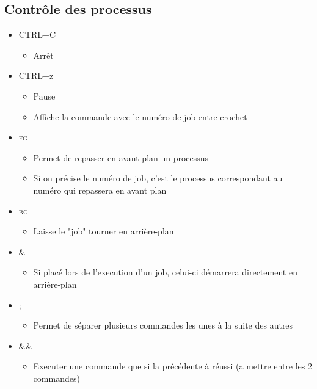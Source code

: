 \documentclass[a4paper]{article}
\begin{document}
      \subsection{Contrôle des processus}
      \begin{itemize}[label = \textbullet, font = \Large]
        \item CTRL+C
        \begin{itemize}[label=, font=\scriptsize] 
          \item Arrêt
        \end{itemize}
        \item CTRL+z
        \begin{itemize}[label=, font=\scriptsize] 
          \item Pause
          \item Affiche la commande avec le numéro de job entre crochet
        \end{itemize}
        \item \textsc{fg}
        \begin{itemize}[label=, font=\scriptsize] 
          \item Permet de repasser en avant plan un processus
          \item Si on précise le numéro de job, c'est le processus correspondant au numéro qui repassera en avant plan
        \end{itemize}
        \item \textsc{bg}
        \begin{itemize}[label=, font=\scriptsize] 
          \item Laisse le "job" tourner en arrière-plan
        \end{itemize}
        \item \&
        \begin{itemize}[label=, font=\scriptsize] 
          \item Si placé lors de l'execution d'un job, celui-ci démarrera directement en arrière-plan
        \end{itemize}
        \item ;
        \begin{itemize}[label=, font=\scriptsize] 
          \item Permet de séparer plusieurs commandes les unes à la suite des autres
        \end{itemize}
        \item \&\&
        \begin{itemize}[label=, font=\scriptsize] 
          \item Executer une commande que si la précédente à réussi (a mettre entre les 2 commandes)
        \end{itemize}
      \end{itemize}
\end{document}

